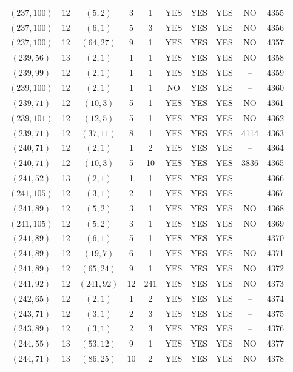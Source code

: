 \begin{longtable}{|c|c|c|c|c|c|c|c|c|c|}
$(237, 100)$ & 12 & $(5, 2)$ & 3 & 1 & YES & YES & YES & NO & 4355\\
$(237, 100)$ & 12 & $(6, 1)$ & 5 & 3 & YES & YES & YES & NO & 4356\\
$(237, 100)$ & 12 & $(64, 27)$ & 9 & 1 & YES & YES & YES & NO & 4357\\
$(239, 56)$ & 13 & $(2, 1)$ & 1 & 1 & YES & YES & YES & NO & 4358\\
$(239, 99)$ & 12 & $(2, 1)$ & 1 & 1 & YES & YES & YES & -- & 4359\\
$(239, 100)$ & 12 & $(2, 1)$ & 1 & 1 & NO & YES & YES & -- & 4360\\
$(239, 71)$ & 12 & $(10, 3)$ & 5 & 1 & YES & YES & YES & NO & 4361\\
$(239, 101)$ & 12 & $(12, 5)$ & 5 & 1 & YES & YES & YES & NO & 4362\\
$(239, 71)$ & 12 & $(37, 11)$ & 8 & 1 & YES & YES & YES & 4114 & 4363\\
$(240, 71)$ & 12 & $(2, 1)$ & 1 & 2 & YES & YES & YES & -- & 4364\\
$(240, 71)$ & 12 & $(10, 3)$ & 5 & 10 & YES & YES & YES & 3836 & 4365\\
$(241, 52)$ & 13 & $(2, 1)$ & 1 & 1 & YES & YES & YES & -- & 4366\\
$(241, 105)$ & 12 & $(3, 1)$ & 2 & 1 & YES & YES & YES & -- & 4367\\
$(241, 89)$ & 12 & $(5, 2)$ & 3 & 1 & YES & YES & YES & NO & 4368\\
$(241, 105)$ & 12 & $(5, 2)$ & 3 & 1 & YES & YES & YES & NO & 4369\\
$(241, 89)$ & 12 & $(6, 1)$ & 5 & 1 & YES & YES & YES & -- & 4370\\
$(241, 89)$ & 12 & $(19, 7)$ & 6 & 1 & YES & YES & YES & NO & 4371\\
$(241, 89)$ & 12 & $(65, 24)$ & 9 & 1 & YES & YES & YES & NO & 4372\\
$(241, 92)$ & 12 & $(241, 92)$ & 12 & 241 & YES & YES & YES & NO & 4373\\
$(242, 65)$ & 12 & $(2, 1)$ & 1 & 2 & YES & YES & YES & -- & 4374\\
$(243, 71)$ & 12 & $(3, 1)$ & 2 & 3 & YES & YES & YES & -- & 4375\\
$(243, 89)$ & 12 & $(3, 1)$ & 2 & 3 & YES & YES & YES & -- & 4376\\
$(244, 55)$ & 13 & $(53, 12)$ & 9 & 1 & YES & YES & YES & NO & 4377\\
$(244, 71)$ & 13 & $(86, 25)$ & 10 & 2 & YES & YES & YES & NO & 4378\\

\end{longtable}
